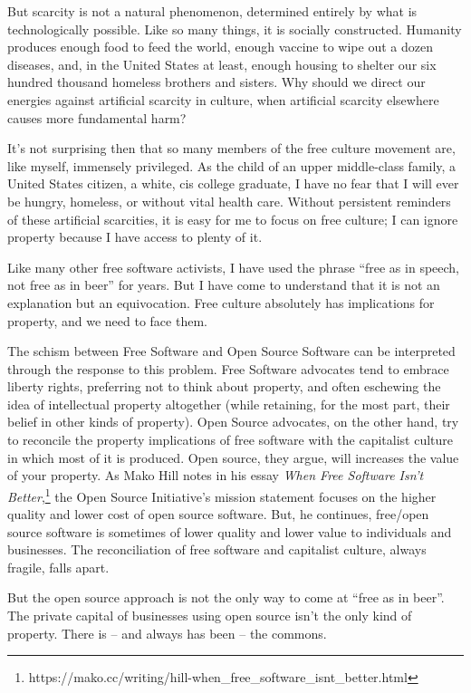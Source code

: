 But scarcity is not a natural phenomenon, determined entirely by what is
technologically possible. Like so many things, it is socially
constructed. Humanity produces enough food to feed the world, enough
vaccine to wipe out a dozen diseases, and, in the United States at
least, enough housing to shelter our six hundred thousand homeless
brothers and sisters. Why should we direct our energies against
artificial scarcity in culture, when artificial scarcity elsewhere
causes more fundamental harm?

It's not surprising then that so many members of the free culture
movement are, like myself, immensely privileged. As the child of an
upper middle-class family, a United States citizen, a white, cis college
graduate, I have no fear that I will ever be hungry, homeless, or
without vital health care. Without persistent reminders of these
artificial scarcities, it is easy for me to focus on free culture; I can
ignore property because I have access to plenty of it.

Like many other free software activists, I have used the phrase ``free
as in speech, not free as in beer'' for years. But I have come to
understand that it is not an explanation but an equivocation. Free
culture absolutely has implications for property, and we need to face
them.

The schism between Free Software and Open Source Software can be
interpreted through the response to this problem. Free Software
advocates tend to embrace liberty rights, preferring not to think about
property, and often eschewing the idea of intellectual property
altogether (while retaining, for the most part, their belief in other
kinds of property). Open Source advocates, on the other hand, try to
reconcile the property implications of free software with the capitalist
culture in which most of it is produced. Open source, they argue, will
increases the value of your property. As Mako Hill notes in his essay
\emph{When Free Software Isn't Better},\footnote{https://mako.cc/writing/hill-when\_free\_software\_isnt\_better.html}
the Open Source Initiative's mission statement focuses on the higher
quality and lower cost of open source software. But, he continues,
free/open source software is sometimes of lower quality and lower value
to individuals and businesses. The reconciliation of free software and
capitalist culture, always fragile, falls apart.

But the open source approach is not the only way to come at ``free as in
beer''. The private capital of businesses using open source isn't the
only kind of property. There is -- and always has been -- the commons.

